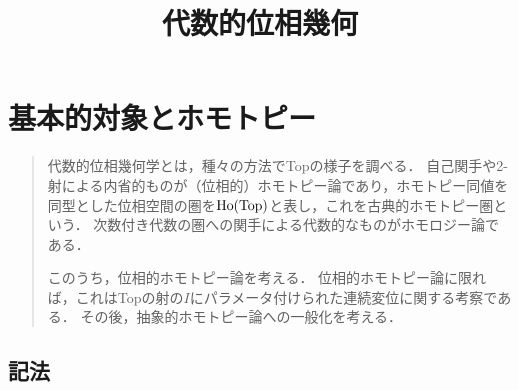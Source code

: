 \documentclass[uplatex,dvipdfmx]{jsreport}
\title{代数的位相幾何}
\author{}
\begin{document}
\tableofcontents

\chapter{基本的対象とホモトピー}

\begin{quotation}
    代数的位相幾何学とは，種々の方法でTopの様子を調べる．
    自己関手や2-射による内省的ものが（位相的）ホモトピー論であり，ホモトピー同値を同型とした位相空間の圏を$\mathrm{Ho}(\mathrm{Top})$と表し，これを古典的ホモトピー圏という．
    次数付き代数の圏への関手による代数的なものがホモロジー論である．

    このうち，位相的ホモトピー論を考える．
    位相的ホモトピー論に限れば，これはTopの射の$I$にパラメータ付けられた連続変位に関する考察である．
    その後，抽象的ホモトピー論への一般化を考える．
\end{quotation}

\section{記法}


\end{document}
